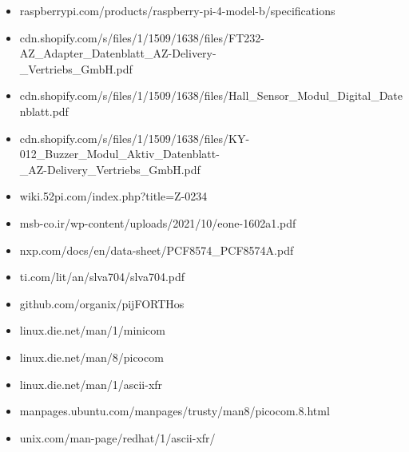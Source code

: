 \documentclass[]{article}
\begin{document}
\begin{itemize}
    \item raspberrypi.com/products/raspberry-pi-4-model-b/specifications
    \item cdn.shopify.com/s/files/1/1509/1638/files/FT232-AZ\_Adapter\_Datenblatt\_AZ-Delivery-
    \\\_Vertriebs\_GmbH.pdf
    \item cdn.shopify.com/s/files/1/1509/1638/files/Hall\_Sensor\_Modul\_Digital\_Datenblatt.pdf
    \item cdn.shopify.com/s/files/1/1509/1638/files/KY-012\_Buzzer\_Modul\_Aktiv\_Datenblatt-
    \\\_AZ-Delivery\_Vertriebs\_GmbH.pdf
    \item wiki.52pi.com/index.php?title=Z-0234
    \item msb-co.ir/wp-content/uploads/2021/10/eone-1602a1.pdf
    \item nxp.com/docs/en/data-sheet/PCF8574\_PCF8574A.pdf
    \item ti.com/lit/an/slva704/slva704.pdf
    \item github.com/organix/pijFORTHos
    \item linux.die.net/man/1/minicom
    \item linux.die.net/man/8/picocom
    \item linux.die.net/man/1/ascii-xfr
    \item manpages.ubuntu.com/manpages/trusty/man8/picocom.8.html
    \item unix.com/man-page/redhat/1/ascii-xfr/
\end{itemize}
\end{document}
